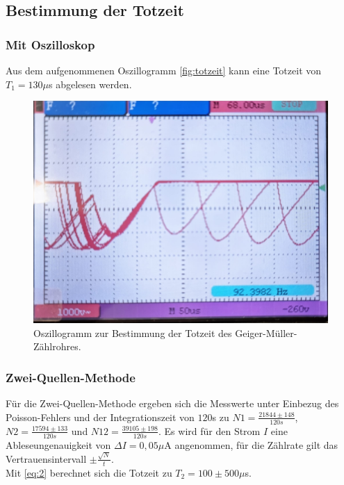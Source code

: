 \subsection{Bestimmung der Totzeit}
\subsubsection{Mit Oszilloskop}
Aus dem aufgenommenen Oszillogramm \autoref{fig:totzeit} kann eine Totzeit von 
$T_1 = 130 \mu$s abgelesen werden.\\
\begin{figure}[H]
  \centering
  \includegraphics[width = \textwidth]{content/totzeit.jpg}
  \caption{Oszillogramm zur Bestimmung der Totzeit des Geiger-Müller-Zählrohres.}
  \label{fig:totzeit}
\end{figure}

\subsubsection{Zwei-Quellen-Methode}
 Für die Zwei-Quellen-Methode ergeben sich die Messwerte unter Einbezug des 
 Poisson-Fehlers und der Integrationszeit von $120$s zu $N1 = \frac{21844 \pm 148}{120s}$, $N2 = \frac{17594 \pm 133}{120s}$ 
 und $N12 = \frac{39105 \pm 198}{120s}$.
 Es wird für den Strom $I$ eine Ableseungenauigkeit von $\Delta I = 0,05 \mu$A angenommen, für die Zählrate 
 gilt das Vertrauensintervall $\pm \frac{\sqrt{N}}{t}$.\\
 Mit \autoref{eq:2} berechnet sich die Totzeit zu $T_2 = 100 \pm 500 \mu$s.




